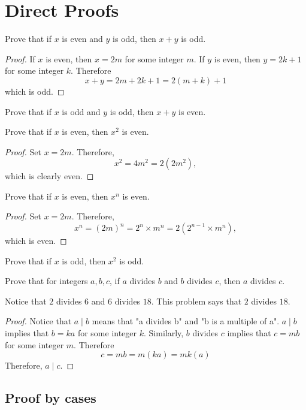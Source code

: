 \section{Direct Proofs}
\begin{exmp}  Prove that if $x$ is even and $y$ is odd, then $x+y$ is odd. \end{exmp}
\begin{proof}
If $x$ is even, then $x=2m$ for some integer $m$.  If $y$ is even, then $y=2k+1$ for some integer $k$.  Therefore $$x+y=2m+2k+1=2(m+k)+1$$ which is odd.  \end{proof}
\begin{prob}  Prove that if $x$ is odd and $y$ is odd, then $x+y$ is even.  \end{prob} 
\begin{exmp}  Prove that if $x$ is even, then $x^2$ is even.  \end{exmp}
\begin{proof}  Set $x=2m$.  Therefore, $$x^2=4m^2=2(2m^2),$$ which is clearly even.   \end{proof}
\begin{exmp}[Generalization]  Prove that if $x$ is even, then $x^n$ is even.  \end{exmp}
\begin{proof}  Set $x=2m$.  Therefore, $$x^n=\left(2m\right)^n=2^n\times m^n=2\left(2^{n-1}\times m^n\right),$$ which is even.  \end{proof}
\begin{prob}  Prove that if $x$ is odd, then $x^2$ is odd.  \end{prob}
\begin{exmp}  Prove that for integers $a,b,c$, if $a$ divides $b$ and $b$ divides $c$, then $a$ divides $c$.  \end{exmp}
\begin{case}  Notice that $2$ divides $6$ and $6$ divides $18$.  This problem says that $2$ divides $18$.  \end{case}  
\begin{proof}  Notice that $a\mid b$ means that "a divides b" and "b is a multiple of a".  $a\mid b$ implies that $b=ka$ for some integer $k$.  Similarly, $b$ divides $c$ implies that $c=mb$ for some integer $m$.  Therefore $$c=mb=m\left(ka\right)=mk\left(a\right)$$
Therefore, $a\mid c$.  \end{proof}


\subsection{Proof by cases}

